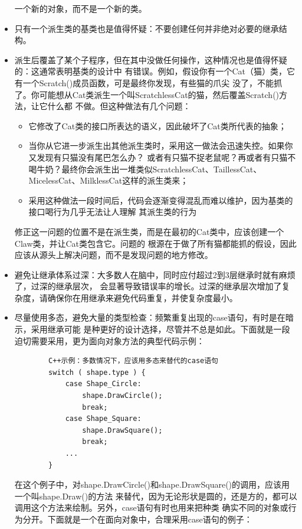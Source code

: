 \documentclass{article}
\begin{document}
\begin{itemize}
    一个新的对象，而不是一个新的类。
    \item 只有一个派生类的基类也是值得怀疑：不要创建任何并非绝对必要的继承结构。
    \item 派生后覆盖了某个子程序，但在其中没做任何操作，这种情况也是值得怀疑的：这通常表明基类的设计中
    有错误。例如，假设你有一个Cat（猫）类，它有一个Scratch()成员函数，可是最终你发现，有些猫的爪尖
    没了，不能抓了。你可能想从Cat类派生一个叫ScratchlessCat的猫，然后覆盖Scratch()方法，让它什么都
    不做。但这种做法有几个问题：
    \begin{itemize}
        \item 它修改了Cat类的接口所表达的语义，因此破坏了Cat类所代表的抽象；
        \item 当你从它进一步派生出其他派生类时，采用这一做法会迅速失控。如果你又发现有只猫没有尾巴怎么办？
        或者有只猫不捉老鼠呢？再或者有只猫不喝牛奶？最终你会派生出一堆类似ScratchlessCat、TaillessCat、
        MicelessCat、MilklessCat这样的派生类来；
        \item 采用这种做法一段时间后，代码会逐渐变得混乱而难以维护，因为基类的接口喝行为几乎无法让人理解
        其派生类的行为
    \end{itemize}
    修正这一问题的位置不是在派生类，而是在最初的Cat类中，应该创建一个Claw类，并让Cat类包含它。问题的
    根源在于做了所有猫都能抓的假设，因此应该从源头上解决问题，而不是发现问题的地方修改。
    \item 避免让继承体系过深：大多数人在脑中，同时应付超过2到3层继承时就有麻烦了，过深的继承层次，
    会显著导致错误率的增长。过深的继承层次增加了复杂度，请确保你在用继承来避免代码重复，并使复杂度最小。
    \item 尽量使用多态，避免大量的类型检查：频繁重复出现的case语句，有时是在暗示，采用继承可能
    是种更好的设计选择，尽管并不总是如此。下面就是一段迫切需要采用，更为面向对象方法的典型代码示例：
    \begin{lstlisting}
        C++示例：多数情况下，应该用多态来替代的case语句
        switch ( shape.type ) {
            case Shape_Circle:
                shape.DrawCircle();
                break;
            case Shape_Square:
                shape.DrawSquare();
                break;
            ...
        }
    \end{lstlisting}
    在这个例子中，对shape.DrawCircle()和shape.DrawSquare()的调用，应该用一个叫shape.Draw()的方法
    来替代，因为无论形状是圆的，还是方的，都可以调用这个方法来绘制。另外，case语句有时也用来把种类
    确实不同的对象或行为分开。下面就是一个在面向对象中，合理采用case语句的例子：

\end{itemize}
\end{document}
